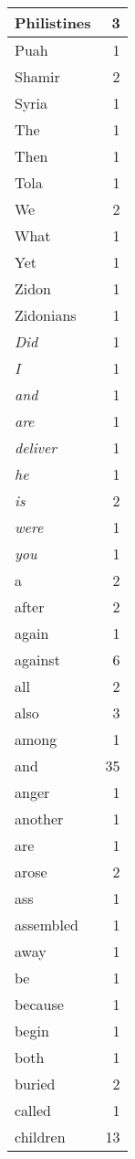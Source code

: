 \begin{center}
\begin{longtable}{l|r}
Philistines & 3\\ \hline 
Puah & 1\\ \hline 
Shamir & 2\\ \hline 
Syria & 1\\ \hline 
The & 1\\ \hline 
Then & 1\\ \hline 
Tola & 1\\ \hline 
We & 2\\ \hline 
What & 1\\ \hline 
Yet & 1\\ \hline 
Zidon & 1\\ \hline 
Zidonians & 1\\ \hline 
\emph{Did} & 1\\ \hline 
\emph{I} & 1\\ \hline 
\emph{and} & 1\\ \hline 
\emph{are} & 1\\ \hline 
\emph{deliver} & 1\\ \hline 
\emph{he} & 1\\ \hline 
\emph{is} & 2\\ \hline 
\emph{were} & 1\\ \hline 
\emph{you} & 1\\ \hline 
a & 2\\ \hline 
after & 2\\ \hline 
again & 1\\ \hline 
against & 6\\ \hline 
all & 2\\ \hline 
also & 3\\ \hline 
among & 1\\ \hline 
and & 35\\ \hline 
anger & 1\\ \hline 
another & 1\\ \hline 
are & 1\\ \hline 
arose & 2\\ \hline 
ass & 1\\ \hline 
assembled & 1\\ \hline 
away & 1\\ \hline 
be & 1\\ \hline 
because & 1\\ \hline 
begin & 1\\ \hline 
both & 1\\ \hline 
buried & 2\\ \hline 
called & 1\\ \hline 
children & 13\\ \hline 

\end{longtable}
\end{center}
